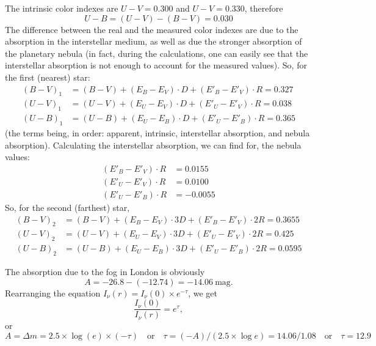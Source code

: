 The intrinsic color indexes are $U - V = 0.300$
and $U - V = 0.330$, therefore
\[
U - B = (U - V) - (B - V) = 0.030
\]
The difference between the real and the measured color indexes are due to the
absorption in the interstellar medium, as well as due the stronger absorption
of the planetary nebula (in fact, during the calculations, one can easily see
that the interstellar absorption is not enough to account for the measured
values). So, for the first (nearest) star:
\begin{align*}
(B-V)_1 &= (B-V) + (E_B - E_V)\cdot D + (E'_B - E'_V)\cdot R = 0.327\\
(U-V)_1 &= (U-V) + (E_U - E_V)\cdot D + (E'_U - E'_V)\cdot R = 0.038\\
(U-B)_1 &= (U-B) + (E_U - E_B)\cdot D + (E'_U - E'_B)\cdot R = 0.365
\tag*{(3 pt)}
\end{align*}
(the terms being, in order: apparent, intrinsic, interstellar absorption, and
nebula absorption). Calculating the interstellar absorption, we can find for,
the nebula values:
\begin{align*}
(E'_B - E'_V)\cdot R &= 0.0155\\
(E'_U - E'_V)\cdot R &= 0.0100\\
(E'_U - E'_B)\cdot R &= -0.0055 \tag*{(1 pt)}
\end{align*}
So, for the second (farthest) star,
\begin{align*}
(B-V)_2 &= (B-V) + (E_B - E_V)\cdot 3D + (E'_B - E'_V)\cdot 2R = \mathbf{0.3655}\\
(U-V)_2 &= (U-V) + (E_U - E_V)\cdot 3D + (E'_U - E'_V)\cdot 2R = \mathbf{0.425}\\
(U-B)_2 &= (U-B) + (E_U - E_B)\cdot 3D + (E'_U - E'_B)\cdot 2R = \mathbf{0.0595}
\tag*{(4 pt + 2 pt final answers)}
\end{align*}

The absorption due to the fog in London is obviously
\[
A = -26.8 - (-12.74) = -14.06~\text{mag}. \tag*{(2 Point)}
\]
Rearranging the equation $I_\nu(r) = I_\nu(0) \times e^{-\tau}$, we get
\[
\frac{I_\nu(0)}{I_\nu(r)} = e^{\tau}, \tag*{(5 Points)}
\]
or
\[
A = \Delta m = 2.5 \times \log(e) \times (-\tau)
\quad\text{or}\quad
\tau = (-A)/(2.5 \times \log e) = 14.06/1.08
\quad\text{or}\quad %
\tau = 12.9 \tag*{(3 Points)}
\]

